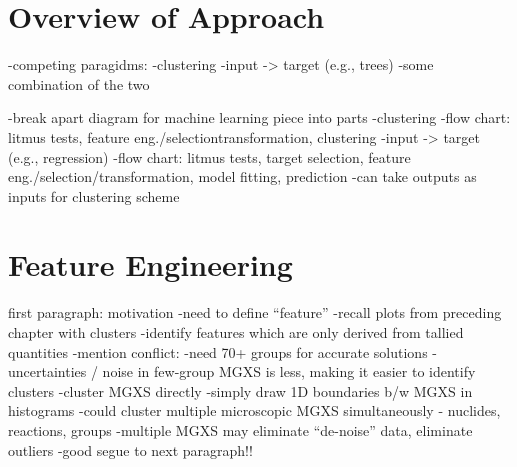 %
%


\section{Overview of Approach}
\label{sec:chap10-overview}

-competing paragidms:
  -clustering
  -input -> target (e.g., trees)
  -some combination of the two

-break apart diagram for machine learning piece into parts
  -clustering
    -flow chart: litmus tests, feature eng./selectiontransformation, clustering
  -input -> target (e.g., regression)
    -flow chart: litmus tests, target selection, feature eng./selection/transformation, model fitting, prediction
     -can take outputs as inputs for clustering scheme


\section{Feature Engineering}
\label{sec:chap10-feature-engineer}

first paragraph: motivation
-need to define ``feature''
-recall plots from preceding chapter with clusters
-identify features which are only derived from tallied quantities
-mention conflict:
  -need 70+ groups for accurate solutions
  -uncertainties / noise in few-group \ac{MGXS} is less, making it easier to identify clusters
-cluster \ac{MGXS} directly
  -simply draw 1D boundaries b/w \ac{MGXS} in histograms
  -could cluster multiple microscopic \ac{MGXS} simultaneously - nuclides, reactions, groups
  -multiple \ac{MGXS} may eliminate ``de-noise'' data, eliminate outliers
    -good segue to next paragraph!!

